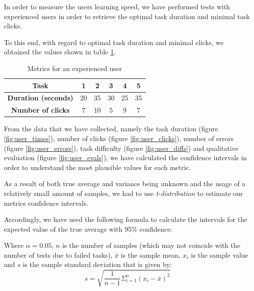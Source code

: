 In order to measure the users learning speed, we have performed tests with experienced users in order to retrieve the optimal task duration and minimal task clicks.

To this end, with regard to optimal task duration and minimal clicks, we obtained the values shown in table \ref{table:optimal}.


\begin{table}[H]
\centering
\caption{Metrics for an experienced user}
\label{table:optimal}
\begin{tabular}{|c|c|c|c|c|c|}
\hline
\textbf{Task} & 1 & 2 & 3 & 4 & 5 \\ \hline
\textbf{Duration (seconds)} & 20 & 35 & 30 & 25 & 35 \\ \hline
\textbf{Number of clicks} & 7 & 10 & 5 & 9 & 7 \\ \hline
\end{tabular}
\end{table}


From the data that we have collected, namely the task duration (figure \ref{fig:user_times}), number of clicks (figure \ref{fig:user_clicks}), number of errors (figure \ref{fig:user_errors}), task difficulty (figure \ref{fig:user_diffs}) and qualitative evaluation (figure \ref{fig:user_evals}), we have calculated the confidence intervals in order to understand the most plausible values for each metric.

As a result of both true average and variance being unknown and the usage of a relatively small amount of samples, we had to use \emph{t-distribution} to estimate our metrics confidence intervals. 

Accordingly, we have used the following formula to calculate the intervals for the expected value of the true average with 95\% confidence:
\begin{equation}
[\bar{x}-F^{-1}_{t_{(n-1)}}(1-\alpha/2)\times \frac{s}{\sqrt{n}}, \bar{x}+F^{-1}_{t_{(n-1)}}(1-\alpha/2)\times \frac{s}{\sqrt{n}}]
\end{equation}

Where $\alpha=0.05$, $n$ is the number of samples (which may not coincide with the number of tests due to failed tasks), $\bar{x}$ is the sample mean, $x_i$ is the sample value and $s$ is the sample standard deviation that is given by:
\begin{equation}
s=\sqrt{\frac{1}{n-1}\Sigma^{n}_{i=1}(x_i-\bar{x})^2}
\end{equation}


